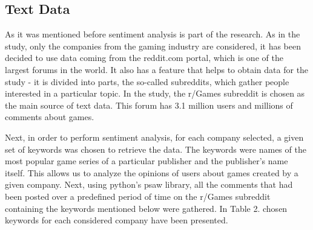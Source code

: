 \documentclass[11pt]{article} %
\begin{document}
\subsection{Text Data}
As it was mentioned before sentiment analysis is part of the research. As in the study, only the companies from the gaming industry are considered, it has been decided to use data coming from the reddit.com portal, which is one of the largest forums in the world. It also has a feature that helps to obtain data for the study - it is divided into parts, the so-called subreddits, which gather people interested in a particular topic. In the study, the r/Games subreddit is chosen as the main source of text data. This forum has 3.1 million users and millions of comments about games. 

Next, in order to perform sentiment analysis, for each company selected, a given set of keywords was chosen to retrieve the data. The keywords were names of the most popular game series of a particular publisher and the publisher's name itself. This allows us to analyze the opinions of users about games created by a given company. Next, using python's psaw library,  all the comments that had been posted over a predefined period of time on the r/Games subreddit containing the keywords mentioned below were gathered. In Table 2. chosen keywords for each considered company have been presented. 
\end{document}
